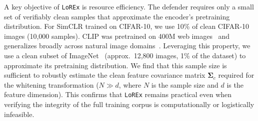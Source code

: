 \documentclass[letterpaper,twocolumn,10pt]{article}
\newcommand{\nhat}[1]{\textcolor{red}{Nhat: #1}}
\newcommand{\mn}[1]{\textcolor{orange!90!black}{Mahmoud: #1}}
\begin{document}
A key objective of \texttt{LoREx} is resource efficiency. The defender requires only a small set of verifiably clean samples that approximate the encoder's pretraining distribution. For SimCLR trained on CIFAR-10, we use 10\% of clean CIFAR-10 images (10,000 samples). CLIP was pretrained on 400M web images~\cite{wit} and generalizes broadly across natural image domains~\cite{CLIP}. Leveraging this property, we use a clean subset of ImageNet~\cite{imagenet} (approx.\ 12,800 images, 1\% of the dataset) to approximate its pretraining distribution. We find that this sample size is sufficient to robustly estimate the clean feature covariance matrix $\bm{\Sigma}_c$ required for the whitening transformation ($N \gg d$, where $N$ is the sample size and $d$ is the feature dimension). This confirms that \texttt{LoREx} remains practical even when verifying the integrity of the full training corpus is computationally or logistically infeasible.

\begin{table}[h]
    \centering
    \caption{Overview of datasets and target models. The trusted clean dataset is a small data fraction from the encoder's pretraining distribution, sufficient for covariance estimation.}
    \label{tab:datasets}
    \renewcommand{\arraystretch}{1.2}
\end{table}

\end{document}
